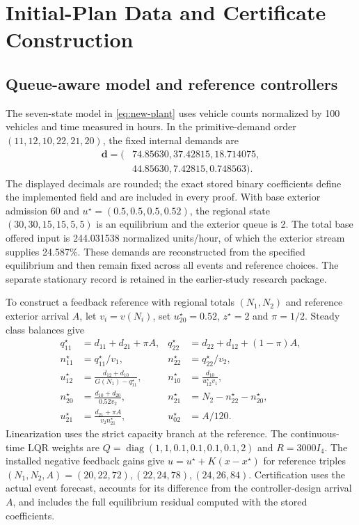 \section{Initial-Plan Data and Certificate Construction}
\label{app:new-model}

\subsection{Queue-aware model and reference controllers}

The seven-state model in \eqref{eq:new-plant} uses vehicle counts normalized
by 100 vehicles and time measured in hours. In the primitive-demand order
$(11,12,10,22,21,20)$, the fixed internal demands are
\begin{equation}
\begin{aligned}
\boldsymbol d=(&74.85630,37.42815,18.714075,\\
              &44.85630,7.42815,0.748563).
\end{aligned}
\label{eq:new-incident-demands}
\end{equation}
The displayed decimals are rounded; the exact stored binary coefficients
define the implemented field and are included in every proof. With base
exterior admission 60 and $u^\star=(0.5,0.5,0.5,0.52)$, the regional
state $(30,30,15,15,5,5)$ is an equilibrium and the exterior queue is 2.
The total base offered input is 244.031538 normalized units/hour, of which
the exterior stream supplies 24.587\%. These demands are reconstructed from
the specified equilibrium and then remain fixed across all events and
reference choices. The separate stationary record is retained in the earlier-study research package.

To construct a feedback reference with regional totals $(N_1,N_2)$ and
reference exterior arrival $A$, let $v_i=v(N_i)$, set
$u_{20}^\star=0.52$, $z^\star=2$ and $\pi=1/2$. Steady class balances give
\begin{equation}
\begin{aligned}
q_{11}^\star&=d_{11}+d_{21}+\pi A,&
q_{22}^\star&=d_{22}+d_{12}+(1-\pi)A,\\
n_{11}^\star&=q_{11}^\star/v_1,&
n_{22}^\star&=q_{22}^\star/v_2,\\
u_{12}^\star&=\frac{d_{12}+d_{10}}{G(N_1)-q_{11}^\star},&
n_{10}^\star&=\frac{d_{10}}{u_{12}^\star v_1},\\
n_{20}^\star&=\frac{d_{10}+d_{20}}{0.52v_2},&
n_{21}^\star&=N_2-n_{22}^\star-n_{20}^\star,\\
u_{21}^\star&=\frac{d_{21}+\pi A}{v_2n_{21}^\star},&
u_{02}^\star&=A/120.
\end{aligned}
\label{eq:new-targets}
\end{equation}
Linearization uses the strict capacity branch at the reference. The
continuous-time LQR weights are
$Q=\operatorname{diag}(1,1,0.1,0.1,0.1,0.1,2)$ and $R=3000I_4$.
The installed negative feedback gains give
$u=u^\star+K(x-x^\star)$ for reference triples
$(N_1,N_2,A)=(20,22,72),(22,24,78),(24,26,84)$.
Certification uses the actual event forecast, accounts for its difference
from the controller-design arrival $A$, and includes the full equilibrium
residual computed with the stored coefficients.

